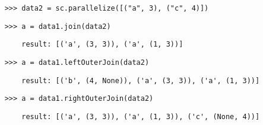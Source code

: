 \begin{lstlisting}
    >>> data2 = sc.parallelize([("a", 3), ("c", 4)])
\end{lstlisting}

\begin{lstlisting}
    >>> a = data1.join(data2)
\end{lstlisting}

\begin{lstlisting}
        result: [('a', (3, 3)), ('a', (1, 3))]
\end{lstlisting}

\begin{lstlisting}
    >>> a = data1.leftOuterJoin(data2)
\end{lstlisting}

\begin{lstlisting}
        result: [('b', (4, None)), ('a', (3, 3)), ('a', (1, 3))]
\end{lstlisting}

\begin{lstlisting}
    >>> a = data1.rightOuterJoin(data2)
\end{lstlisting}

\begin{lstlisting}
        result: [('a', (3, 3)), ('a', (1, 3)), ('c', (None, 4))]
\end{lstlisting}
